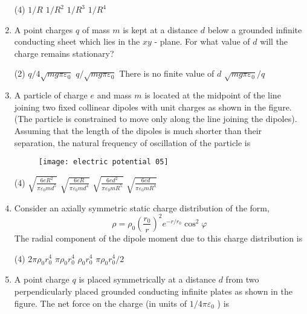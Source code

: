 \begin{enumerate}[label=\color{ocre}\textbf{\arabic*.}]
\begin{figure}[H]
	\end{figure}
	\begin{tasks}(4)
		\task[\textbf{A.}] $1 / R$
		\task[\textbf{B.}] $1 / R^{2}$
		\task[\textbf{C.}] $1 / R^{3}$
		\task[\textbf{D.}] $1 / R^{4}$
	\end{tasks}
	\item  A point charges $q$ of mass $m$ is kept at a distance $d$ below a grounded infinite conducting sheet which lies in the $x y$ - plane. For what value of $d$ will the charge remains stationary?
	{}
	\begin{tasks}(2)
		\task[\textbf{A.}] $q / 4 \sqrt{m g \pi \varepsilon_{0}}$
		\task[\textbf{B.}] $q / \sqrt{m g \pi \varepsilon_{0}}$
		\task[\textbf{C.}] There is no finite value of $d$
		\task[\textbf{D.}]  $\sqrt{m g \pi \varepsilon_{0}} / q$
	\end{tasks}
	\item A particle of charge $e$ and mass $m$ is located at the midpoint of the line joining two fixed collinear dipoles with unit charges as shown in the figure. (The particle is constrained to move only along the line joining the dipoles). Assuming that the length of the dipoles is much shorter than their separation, the natural frequency of oscillation of the particle is
	{}
	\begin{figure}[H]
		\centering
		\texttt{[image: electric potential 05]}
	\end{figure}
	\begin{tasks}(4)
		\task[\textbf{A.}] $\sqrt{\frac{6 e R^{2}}{\pi \varepsilon_{0} m d^{5}}}$
		\task[\textbf{B.}] $\sqrt{\frac{6 e R}{\pi \varepsilon_{0} m d^{4}}}$
		\task[\textbf{C.}]  $\sqrt{\frac{6 e d^{2}}{\pi \varepsilon_{0} m R^{5}}}$
		\task[\textbf{D.}] $\sqrt{\frac{6 e d}{\pi \varepsilon_{0} m R^{4}}}$
	\end{tasks}
	\item Consider an axially symmetric static charge distribution of the form,
	$$
	\rho=\rho_{0}\left(\frac{r_{0}}{r}\right)^{2} e^{-r / r_{0}} \cos ^{2} \varphi
	$$
	The radial component of the dipole moment due to this charge distribution is
	{}
	\begin{tasks}(4)
		\task[\textbf{A.}] $2 \pi \rho_{0} r_{0}^{4}$
		\task[\textbf{B.}] $\pi \rho_{0} r_{0}^{4}$
		\task[\textbf{C.}] $\rho_{0} r_{0}^{4}$
		\task[\textbf{D.}] $\pi \rho_{0} r_{0}^{4} / 2$
	\end{tasks}
	\item A point charge $q$ is placed symmetrically at a distance $d$ from two perpendicularly placed grounded conducting infinite plates as shown in the figure. The net force on the charge (in units of $1 / 4 \pi \varepsilon_{0}$ ) is

\end{enumerate}
